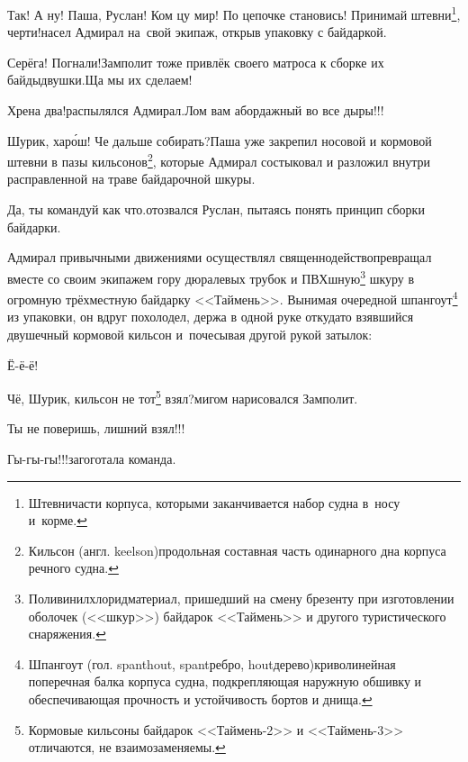 \renewcommand*{\thefootnote}{\arabic{footnote}}
\setcounter{footnote}{0}
\diagdash Так! А ну! Паша, Руслан! Ком цу мир! По цепочке становись! Принимай штевни\footnote{Штевни\mdash части корпуса, которыми заканчивается набор судна в~носу и~корме.}, черти!\mdash насел Адмирал на~свой экипаж, открыв упаковку с байдаркой.

\diagdash Серёга! Погнали!\mdash Замполит тоже привлёк своего матроса к сборке их байды\sdash двушки.\mdash Ща мы их сделаем!

\diagdash Хрена два!\mdash распылялся Адмирал.\mdash Лом вам абордажный во все дыры!!! 

\diagdash Шурик, хар\'{о}ш! Че дальше собирать?\mdash Паша уже закрепил носовой и кормовой штевни в пазы кильсонов\footnote{Кильсон (англ. keelson)\mdash продольная составная часть одинарного дна корпуса речного судна\cite{МорскойСправочник}.}, которые Адмирал состыковал и разложил внутри расправленной на траве байдарочной шкуры.

\diagdash Да, ты командуй как что.\mdash отозвался Руслан, пытаясь понять принцип сборки байдарки.

Адмирал привычными движениями осуществлял священнодейство\mdash превращал вместе со своим экипажем гору дюралевых трубок и ПВХ\sdash шную\footnote{Поливинилхлорид\mdash материал, пришедший на смену брезенту при изготовлении оболочек (<<шкур>>) байдарок <<Таймень>> и другого туристического снаряжения.} шкуру в огромную трёхместную байдарку <<Таймень>>. Вынимая очередной шпангоут\footnote{Шпангоут (гол. spanthout, spant\mdash ребро, hout\mdash дерево)\mdash криволинейная поперечная балка корпуса судна, подкрепляющая наружную обшивку и обеспечивающая прочность и устойчивость бортов и днища\cite{МорскойСправочник}.} из упаковки, он вдруг похолодел, держа в одной руке откуда\sdash то взявшийся двушечный кормовой кильсон и~почесывая другой рукой затылок:

\diagdash Ё-ё-ё!

\renewcommand*{\thefootnote}{\arabic{footnote}}
\setcounter{footnote}{0}
\diagdash Чё, Шурик, кильсон не тот\footnote{Кормовые кильсоны байдарок <<Таймень-2>> и <<Таймень-3>> отличаются, не взаимозаменяемы.} взял?\mdash мигом нарисовался Замполит.

\diagdash Ты не поверишь, лишний взял!!!

\diagdash Гы-гы-гы!!!\mdash загоготала команда.

